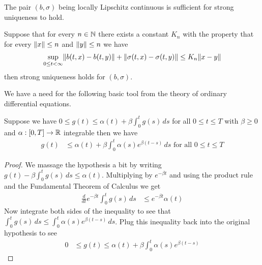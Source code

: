 The pair $(b,\sigma)$ being locally Lipschitz continuous is sufficient for strong uniqueness to hold.
\begin{thm}\label{StrongUniquenessSDE}Suppose that for every $n \in \mathbb{N}$ there exists a constant $K_n$ with the property that for every $\lVert x \rVert \leq n$ and $\lVert y \rVert \leq n$ we have
\begin{align*}
\sup_{0 \leq t < \infty} \lVert b(t,x) - b(t,y) \rVert + \lVert \sigma(t,x) - \sigma(t,y) \rVert \leq K_n \lVert x-y \rVert
\end{align*}
then strong uniqueness holds for $(b,\sigma)$.
\end{thm}

We have a need for the following basic tool from the theory of ordinary differential equations.
\begin{prop}\label{GronwallsInequality}Suppose we have $0 \leq g(t) \leq \alpha(t) + \beta \int_0^t g(s) \, ds$ for all $0 \leq t \leq T$ with $\beta \geq 0$ and $\alpha : [0,T] \to \mathbb{R}$ integrable then we have
\begin{align*}
g(t) &\leq \alpha(t) + \beta \int_0^t \alpha(s) e^{\beta(t-s)} \, ds \text{ for all $0 \leq t \leq T$}
\end{align*}
\end{prop}
\begin{proof}
We massage the hypothesis a bit by writing $g(t) - \beta \int_0^t g(s) \, ds \leq \alpha(t)$.  Multiplying by $e^{-\beta t}$ and using the product rule and the Fundamental Theorem of Calculus we get
\begin{align*}
\frac{d}{dt} e^{-\beta t} \int_0^t g(s) \, ds &\leq e^{-\beta t} \alpha(t)
\end{align*}
Now integrate both sides of the inequality to see that $\int_0^t g(s) \, ds \leq \int_0^t \alpha(s) e^{\beta(t-s)} \, ds$.  Plug this inequality back into the original hypothesis to see
\begin{align*}
0  &\leq g(t) \leq \alpha(t) + \beta \int_0^t \alpha(s) e^{\beta(t-s)}
\end{align*}
\end{proof}

